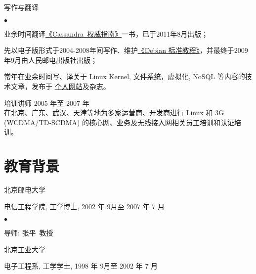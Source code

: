 \documentclass[margin,line]{res}
\newenvironment{list1}{
  \begin{list}{\ding{113}}{%
      \setlength{\itemsep}{0in}
      \setlength{\parsep}{0in} \setlength{\parskip}{0in}
      \setlength{\topsep}{0in} \setlength{\partopsep}{0in} 
      \setlength{\leftmargin}{0.17in}}}{\end{list}}
\newenvironment{list2}{
  \begin{list}{$\bullet$}{%
      \setlength{\itemsep}{0in}
      \setlength{\parsep}{0in} \setlength{\parskip}{0in}
      \setlength{\topsep}{0in} \setlength{\partopsep}{0in} 
      \setlength{\leftmargin}{0.2in}}}{\end{list}}
\begin{document}
\begin{resume}
\textsf{写作与翻译} \\
\vspace*{-.1in}
\begin{list2}
\item 业余时间翻译\href{http://wangxu.me/blog/cassandra-the-definitive-guide}{《Cassandra~权威指南》}一书，已于2011年8月出版；
\item 先以电子版形式于2004-2008年间写作、维护\href{http://wangxu.me/blog/unleashed-debian}{《Debian 标准教程》}，并最终于2009年9月由人民邮电出版社出版；
\item 常年在业余时间写、译关于 Linux Kernel, 文件系统，虚拟化, NoSQL 等内容的技术文章，发布于 \href{http://wangxu.me/blog/}{个人网站}及杂志。
\end{list2}

\textsf{培训讲师} \hfill \textsf{2005 年至 2007 年}\\
在北京、广东、武汉、天津等地为多家运营商、开发商进行 Linux 和 3G (WCDMA/TD-SCDMA) 的核心网、业务及无线接入网相关员工培训和认证培训。

\section{教育背景}
\textsf{北京邮电大学}\\
\vspace*{-.1in}
\begin{list1}
\item[] 电信工程学院, 工学博士, 2002 年 9月至 2007 年 7 月
\begin{list2}
\vspace*{.05in}
\item 导师: 张平\ 教授
\end{list2}
\end{list1}

\textsf{北京工业大学}\\
\vspace*{-.1in}
\begin{list1}
\item[] 电子工程系, 工学学士, 1998 年 9月至 2002 年 7 月 
\end{list1}


\end{resume}
\end{document}
